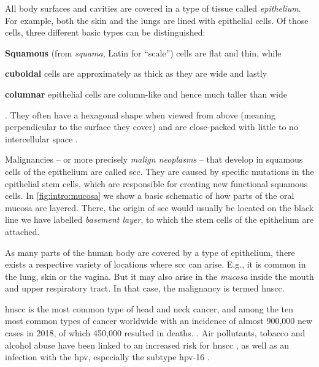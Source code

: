 \documentclass[\relativeRoot/main.tex]{subfiles}
\begin{document}
All body surfaces and cavities are covered in a type of tissue called \emph{epithelium}. For example, both the skin and the lungs are lined with epithelial cells. Of those cells, three different basic types can be distinguished:
\begin{enumerate*}[label={(\arabic*)}]
    \item \textbf{Squamous} (from \emph{squama}, Latin for ``scale'') cells are flat and thin, while 
    \item \textbf{cuboidal} cells are approximately as thick as they are wide and lastly
    \item \textbf{columnar} epithelial cells are column-like and hence much taller than wide
\end{enumerate*}.
They often have a hexagonal shape when viewed from above (meaning perpendicular to the surface they cover) and are close-packed with little to no intercellular space \cite{marieb_human_1995}.

Malignancies -- or more precisely \emph{malign neoplasms} -- that develop in squamous cells of the epithelium are called \gls{scc}. They are caused by specific mutations in the epithelial stem cells, which are responsible for creating new functional squamous cells. In \cref{fig:intro:mucosa} we show a basic schematic of how parts of the oral mucosa are layered. There, the origin of \gls{scc} would usually be located on the black line we have labelled \emph{basement layer}, to which the stem cells of the epithelium are attached.

As many parts of the human body are covered by a type of epithelium, there exists a respective variety of locations where \gls{scc} can arise. E.g., it is common in the lung, skin or the vagina. But it may also arise in the \emph{mucosa} inside the mouth and upper respiratory tract. In that case, the malignancy is termed \gls{hnscc}.

\gls{hnscc} is the most common type of head and neck cancer, and among the ten most common types of cancer worldwide with an incidence of almost 900,000 new cases in 2018, of which 450,000 resulted in deaths. \cite{johnson_head_2020,ferlay_estimating_2019,bray_global_2018}. Air pollutants, tobacco and alcohol abuse have been linked to an increased risk for \gls{hnscc} \cite{johnson_head_2020,wong_cancers_2014}, as well as an infection with the \gls{hpv}, especially the subtype \gls{hpv}-16 \cite{hennessey_human_2009}.
\end{document}
